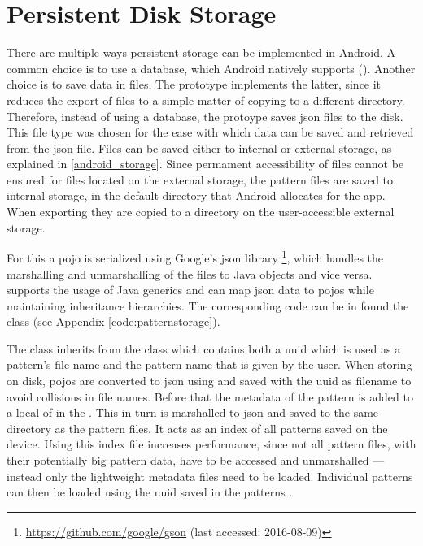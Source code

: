 \section{Persistent Disk Storage}
\label{implementation_storage}
There are multiple ways persistent storage can be implemented in Android. A common choice is to use a  database, which Android natively supports (\cite{android_saving_data}). Another choice is to save data in files. The prototype implements the latter, since it reduces the export of files to a simple matter of copying to a different directory. Therefore, instead of using a database, the protoype saves \gls{json} files to the disk. This file type was chosen for the ease with which data can be saved and retrieved from the \gls{json} file. Files can be saved either to internal or external storage, as explained in \ref{android_storage}. Since permament accessibility of files cannot be ensured for files located on the external storage, the pattern files are saved to internal storage, in the default directory that Android allocates for the app. When exporting they are copied to a directory on the user-accessible external storage. 

For this a  \gls{pojo} is serialized using Google’s \gls{json} library \footnote{\url{https://github.com/google/gson} (last accessed: 2016-08-09)}, which handles the marshalling and unmarshalling of the files to Java objects and vice versa.  supports the usage of Java generics and can map \gls{json} data to \gls{pojo}s while maintaining inheritance hierarchies. The corresponding code can be in found the class  (see Appendix \ref{code:patternstorage}).

The  class inherits from the class  which contains both a \gls{uuid} which is used as a pattern's file name and the pattern name that is given by the user. When storing on disk,  \gls{pojo}s are converted to \gls{json} using  and saved with the \gls{uuid} as filename to avoid collisions in file names. Before that the metadata of the pattern is added to a local  of  in the .  This  in turn is marshalled to \gls{json} and saved to the same directory as the pattern files. It acts as an index of all patterns saved on the device. Using this index file increases performance, since not all pattern files, with their potentially big pattern data, have to be accessed and unmarshalled --- instead only the lightweight metadata files need to be loaded. Individual patterns can then be loaded using the \gls{uuid} saved in the patterns .



